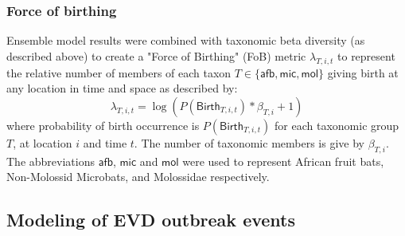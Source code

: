 \documentclass[9pt,twoside,lineno]{pnas-new}
\newcommand{\afb}{\mathsf{afb}}
\newcommand{\mic}{\mathsf{mic}}
\newcommand{\mol}{\mathsf{mol}}
\begin{document}
\subsubsection*{Force of birthing}
Ensemble model results were combined with taxonomic beta diversity (as described above) to create a "Force of Birthing" (FoB) metric $\lambda_{T,i,t}$ to represent the relative number of members of each taxon $T \in \{\afb, \mic, \mol\}$ giving birth at any location in time and space as described by:
\[
  	    \lambda_{T,i,t} = \log(P(\mathsf{Birth}_{T,i,t})*\beta_{T,i} +1)
\]
where probability of birth occurrence is $P(\mathsf{Birth}_{T,i,t})$ for each taxonomic group $T$, at location $i$ and time $t$. The number of taxonomic members is give by $\beta_{T,i}$. The abbreviations $\afb$, $\mic$ and $\mol$ were used to represent African fruit bats, Non-Molossid Microbats, and Molossidae respectively. \par 
\subsection*{Modeling of EVD outbreak events}
\label{spatGLM}
\end{document}
